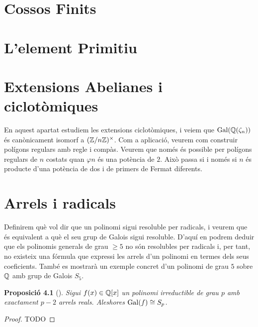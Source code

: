 \documentclass[
]{book}
\newtheorem{proposition}{Proposició}[chapter]
\theoremstyle{definition}
\theoremstyle{definition}
\theoremstyle{definition}
\theoremstyle{definition}
\theoremstyle{remark}
\begin{document}
\hypertarget{cossos-finits}{%
\chapter{Cossos Finits}\label{cossos-finits}}

\hypertarget{lelement-primitiu}{%
\chapter{L'element Primitiu}\label{lelement-primitiu}}

\hypertarget{extensions-abelianes-i-ciclotuxf2miques}{%
\chapter{Extensions Abelianes i ciclotòmiques}\label{extensions-abelianes-i-ciclotuxf2miques}}

En aquest apartat estudiem les extensions ciclotòmiques, i veiem que \(\operatorname{Gal}(\mathbb{Q}(\zeta_n))\)
és canònicament isomorf a \((\mathbb{Z}/n\mathbb{Z})^\times\). Com a aplicació, veurem com construir
polígons regulars amb regle i compàs. Veurem que només és possible per polígons regulars
de \(n\) costats quan \(\varphi{n}\) és una potència de \(2\). Això passa si i només si \(n\) és producte
d'una potència de dos i de primers de Fermat diferents.

\hypertarget{arrels-i-radicals}{%
\chapter{Arrels i radicals}\label{arrels-i-radicals}}

Definirem què vol dir que un polinomi sigui resoluble per radicals, i veurem
que és equivalent a què el seu grup de Galois sigui resoluble. D'aquí en podrem
deduir que els polinomis generals de grau \(\geq 5\) no són resolubles per radicals i,
per tant, no existeix una fórmula que expressi les arrels d'un polinomi en termes
dels seus coeficients. També es mostrarà un exemple concret d'un polinomi de grau \(5\) sobre \(\mathbb{Q}\)
amb grup de Galois \(S_5\).

\begin{proposition}[]
Sigui \(f(x)\in \mathbb{Q}[x]\) un polinomi irreductible de grau \(p\) amb exactament \(p-2\) arrels reals. Aleshores \(\operatorname{Gal}(f)\cong S_p\).
\end{proposition}

\begin{proof}
TODO
\end{proof}
\end{document}
